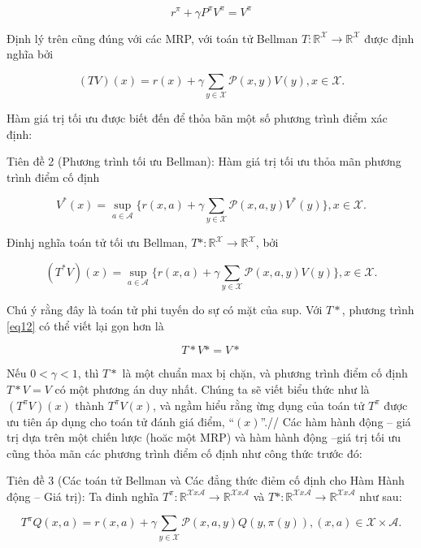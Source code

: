 \documentclass[14pt,a4paper,oneside]{report}		%
\begin{document}
\begin{equation} \label{eq11}
r^\pi+\gamma P^\pi V^\pi=V^\pi
\end{equation}

Định lý trên cũng đúng với các MRP, với toán tử Bellman $T:\mathbb{R}^\mathcal{X}\rightarrow\mathbb{R}^\mathcal{X}$ được định nghĩa bởi

$$(TV)(x) = r(x) + \gamma \displaystyle\sum_{y\in\mathcal{X}}{\mathcal{P}(x,y)V(y)}, x\in\mathcal{X}.$$

Hàm giá trị tối ưu được biết đến để thỏa bãn một số phương trình điểm xác định:

Tiên đề 2 (Phương trình tối ưu Bellman): Hàm giá trị tối ưu thỏa mãn phương trình điểm cố định

\begin{equation} \label{eq12}
V^*(x)=\sup_{a\in\mathcal{A}}\bigg\{ r(x,a) + \gamma \displaystyle\sum_{y\in\mathcal{X}}{\mathcal{P}(x,a,y)V^*(y)}\bigg\} , x\in\mathcal{X}.
\end{equation}

Đinhj nghĩa toán tử tối ưu Bellman, $T*:\mathbb{R}^\mathcal{X}\rightarrow\mathbb{R}^\mathcal{X}$, bởi

\begin{equation} \label{eq13}
(T^*V)(x)=\sup_{a\in\mathcal{A}}\bigg\{ r(x,a) + \gamma \displaystyle\sum_{y\in\mathcal{X}}{\mathcal{P}(x,a,y)V(y)}\bigg\} , x\in\mathcal{X}.
\end{equation}

Chú ý rằng đây là toán tử phi tuyến do sự có mặt của sup. Với $T*$, phương trình \ref{eq12} có thể viết lại gọn hơn là 

$$T*V*=V*$$

Nếu $0<\gamma<1$, thì $T*$ là một chuẩn max bị chặn, và phương trình điểm cố định $T*V=V$ có một phương án duy nhất.
Chúng ta sẽ viết biểu thức như là $(T^\pi V)(x)$ thành $T^\pi V(x)$, và ngầm hiểu rằng ừng dụng của toán tử $T^\pi$ được ưu tiên áp dụng cho toán tử đánh giá điểm, “$(x)$”.//
Các hàm hành động – giá trị dựa trên một chiến lược (hoăc một MRP) và hàm hành động –giá trị tối ưu cũng thỏa mãn các phương trình điểm cố định như công thức trước đó:

Tiên đề 3 (Các toán tử Bellman và Các đẳng thức điẻm cố định cho Hàm Hành động – Giá trị): Ta đinh nghĩa $T^\pi: \mathbb{R}^{\mathcal{X}x\mathcal{A}}\rightarrow\mathbb{R}^{\mathcal{X}x\mathcal{A}}$ và $T*: \mathbb{R}^{\mathcal{X}x\mathcal{A}}\rightarrow\mathbb{R}^{\mathcal{X}x\mathcal{A}}$ như sau:

\begin{equation} \label{eq14}
T^\pi Q(x,a)= r(x,a) + \gamma \sum_{y\in\mathcal{X}}\mathcal{P}(x,a,y)Q(y,\pi(y)), (x,a)\in\mathcal{X}\times\mathcal{A}.
\end{equation}
\end{document}
